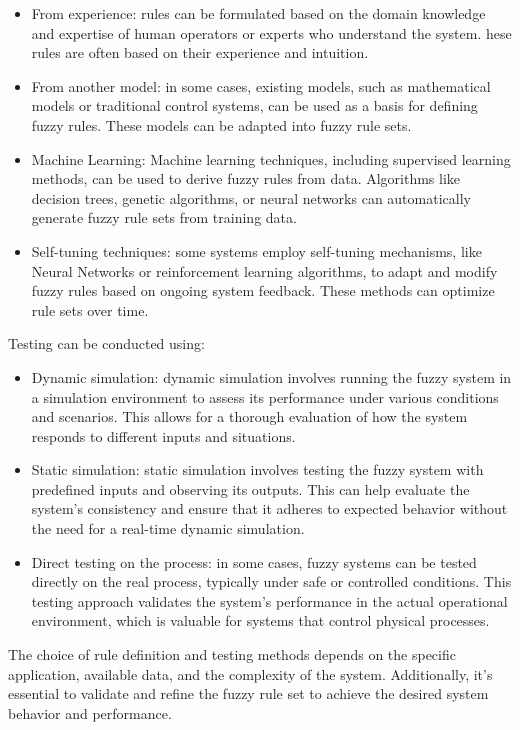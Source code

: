\documentclass[12pt, a4paper]{report}
\begin{document}
    \begin{itemize}
        \item From experience: rules can be formulated based on the domain knowledge and expertise of human operators or experts who understand the system. 
            hese rules are often based on their experience and intuition.
        \item From another model: in some cases, existing models, such as mathematical models or traditional control systems, can be used as a basis for defining fuzzy rules.
            These models can be adapted into fuzzy rule sets.
        \item Machine Learning: Machine learning techniques, including supervised learning methods, can be used to derive fuzzy rules from data. 
            Algorithms like decision trees, genetic algorithms, or neural networks can automatically generate fuzzy rule sets from training data.
        \item Self-tuning techniques: some systems employ self-tuning mechanisms, like Neural Networks or reinforcement learning algorithms, to adapt and modify fuzzy rules based on ongoing system feedback. 
            These methods can optimize rule sets over time.
    \end{itemize}
    Testing can be conducted using:
    \begin{itemize}
        \item Dynamic simulation: dynamic simulation involves running the fuzzy system in a simulation environment to assess its performance under various conditions and scenarios. 
            This allows for a thorough evaluation of how the system responds to different inputs and situations.
        \item Static simulation: static simulation involves testing the fuzzy system with predefined inputs and observing its outputs. 
            This can help evaluate the system's consistency and ensure that it adheres to expected behavior without the need for a real-time dynamic simulation.
        \item Direct testing on the process: in some cases, fuzzy systems can be tested directly on the real process, typically under safe or controlled conditions. 
            This testing approach validates the system's performance in the actual operational environment, which is valuable for systems that control physical processes.
    \end{itemize}
    The choice of rule definition and testing methods depends on the specific application, available data, and the complexity of the system. 
    Additionally, it's essential to validate and refine the fuzzy rule set to achieve the desired system behavior and performance.
\end{document}
